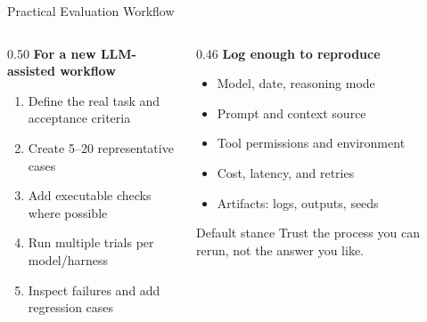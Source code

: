 \begin{frame}{Practical Evaluation Workflow}
  \begin{columns}[T, onlytextwidth]
    \begin{column}{0.50\textwidth}
      \textbf{For a new LLM-assisted workflow}\\[0.3em]
      \begin{enumerate}
        \item Define the real task and acceptance criteria
        \item Create 5--20 representative cases
        \item Add executable checks where possible
        \item Run multiple trials per model/harness
        \item Inspect failures and add regression cases
      \end{enumerate}
    \end{column}
    \hfill
    \begin{column}{0.46\textwidth}
      \textbf{Log enough to reproduce}\\[0.3em]
      \begin{itemize}
        \item Model, date, reasoning mode
        \item Prompt and context source
        \item Tool permissions and environment
        \item Cost, latency, and retries
        \item Artifacts: logs, outputs, seeds
      \end{itemize}
      \vspace{0.4em}
      \begin{alertblock}{Default stance}
        Trust the process you can rerun, not the answer you like.
      \end{alertblock}
    \end{column}
  \end{columns}
\end{frame}
